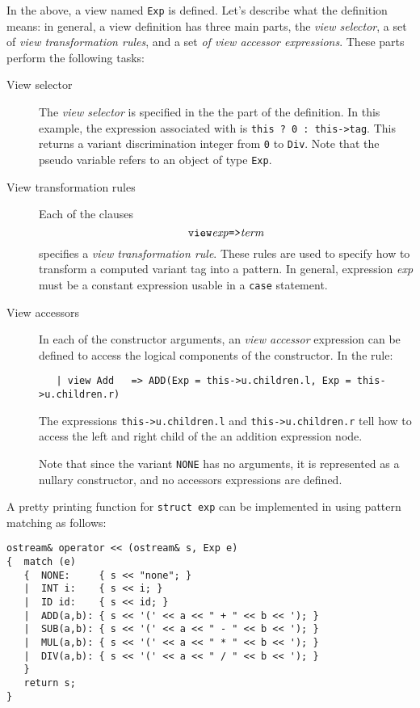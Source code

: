 In the above, a view named \verb|Exp| is defined.   Let's describe
what the definition means: in general, 
a view definition has three main parts, the {\em view selector},
a set of {\em view transformation rules}, and a set {\em of view accessor
expressions}.  These parts perform the following tasks:

\begin{description}
\item[View selector]  The {\em view selector} is specified in the
the  part of the definition.   In this example, 
the expression associated with  is 
\verb|this ? 0 : this->tag|.  This returns a variant discrimination integer
from \verb|0| to \verb|Div|.  
Note that the pseudo variable  
refers to an object of type \verb|Exp|.

\item[View transformation rules]
Each of the clauses 
\[ \TDEF{view} {\it exp} \verb|=>| {\it term} \]
specifies
a {\em view transformation rule}.   These rules are used to specify
how to transform a computed variant tag into a pattern.    In general,
expression {\it exp} must be a constant expression usable in a 
\verb|case| statement.

\item[View accessors]
In each of the constructor arguments, an {\em view accessor} expression
can be defined to access the logical components of the constructor.
In the rule:
\begin{verbatim}
   | view Add   => ADD(Exp = this->u.children.l, Exp = this->u.children.r)
\end{verbatim}

The expressions \verb|this->u.children.l| and \verb|this->u.children.r|
tell \Prop{} how to access the left and right child of the an addition
expression node.

Note that since the variant \verb|NONE| has no arguments, it is represented
as a nullary constructor, and no accessors expressions are defined.
\end{description}

A pretty printing function for \verb|struct exp| can be implemented
in \Prop{} using pattern matching as follows:
\begin{verbatim}
ostream& operator << (ostream& s, Exp e)
{  match (e)
   {  NONE:     { s << "none"; }
   |  INT i:    { s << i; }
   |  ID id:    { s << id; }
   |  ADD(a,b): { s << '(' << a << " + " << b << '); }
   |  SUB(a,b): { s << '(' << a << " - " << b << '); }
   |  MUL(a,b): { s << '(' << a << " * " << b << '); }
   |  DIV(a,b): { s << '(' << a << " / " << b << '); }
   }
   return s;
}
\end{verbatim}


